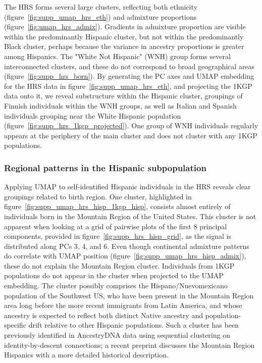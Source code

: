 \documentclass[12pt]{pnas-new}
\begin{document}
The HRS forms several large clusters, reflecting both ethnicity (figure~\ref{fig:supp_umap_hrs_eth}) and admixture proportions (figure~\ref{fig:umap_hrs_admix}). Gradients in admixture proportion are visible within the predominantly Hispanic cluster, but not within the predominantly Black cluster, perhaps because the variance in ancestry proportions is greater among Hispanics. The "White Not Hispanic" (WNH) group forms several interconnected clusters, and these do not correspond to broad geographical areas (figure~\ref{fig:supp_hrs_born}). By generating the PC axes and UMAP embedding for the HRS data in figure~\ref{fig:supp_umap_hrs_eth}, and projecting the 1KGP data onto it, we reveal substructure within the Hispanic cluster, groupings of Finnish individuals within the WNH groups, as well as Italian and Spanish individuals grouping near the White Hispanic population (figure~\ref{fig:supp_hrs_1kgp_projected}). One group of WNH individuals regularly appears at the periphery of the main cluster and does not cluster with any 1KGP populations.

\subsubsection*{Regional patterns in the Hispanic subpopulation} Applying UMAP to self-identified Hispanic individuals in the HRS reveals clear groupings related to birth region. One cluster, highlighted in figure~\ref{fig:supp_umap_hrs_hisp_1kgp_hisp}, consists almost entirely of individuals born in the Mountain Region of the United States. This cluster is not apparent when looking at a grid of pairwise plots of the first 8 principal components, provided in figure~\ref{fig:supp_hrs_hisp_grid}, as the signal is distributed along PCs 3, 4, and 6. Even though continental admixture patterns do correlate with UMAP position (figure~\ref{fig:supp_umap_hrs_hisp_admix}), these do not explain the Mountain Region cluster. Individuals from 1KGP populations do not appear in the cluster when projected to the UMAP embedding. The cluster possibly comprises the Hispano/Nuevomexicano population of the Southwest US, who have been present in the Mountain Region area long before the more recent immigrants from Latin America, and whose ancestry is expected to reflect both distinct Native ancestry and population-specific drift relative to other Hispanic populations. Such a cluster has been previously identified in AncestryDNA data using sequential clustering on identity-by-descent connections\cite{han2017clustering}; a recent preprint discusses the Mountain Region Hispanics with a more detailed historical description\cite{Jordan333609}.  
\end{document}
